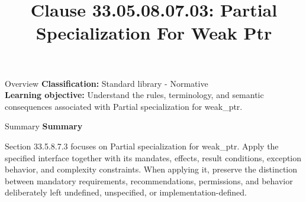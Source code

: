 \documentclass[10pt,letterpaper]{article}
\title{Clause 33.05.08.07.03: Partial Specialization For Weak Ptr}
\author{}
\date{}
\begin{document}
\maketitle
\begin{CornellOverviewBox}{Overview}
\textbf{Classification:} Standard library - Normative\\[2pt]
\textbf{Learning objective:} Understand the rules, terminology, and semantic consequences associated with Partial specialization for weak\_ptr.
\end{CornellOverviewBox}\begin{CornellSummaryBox}{Summary}
{\sffamily\bfseries\color{Accent} Summary}\par\vspace{3pt}Section 33.5.8.7.3 focuses on Partial specialization for weak\_ptr. Apply the specified interface together with its mandates, effects, result conditions, exception behavior, and complexity constraints. When applying it, preserve the distinction between mandatory requirements, recommendations, permissions, and behavior deliberately left undefined, unspecified, or implementation-defined.
\end{CornellSummaryBox}
\end{document}
